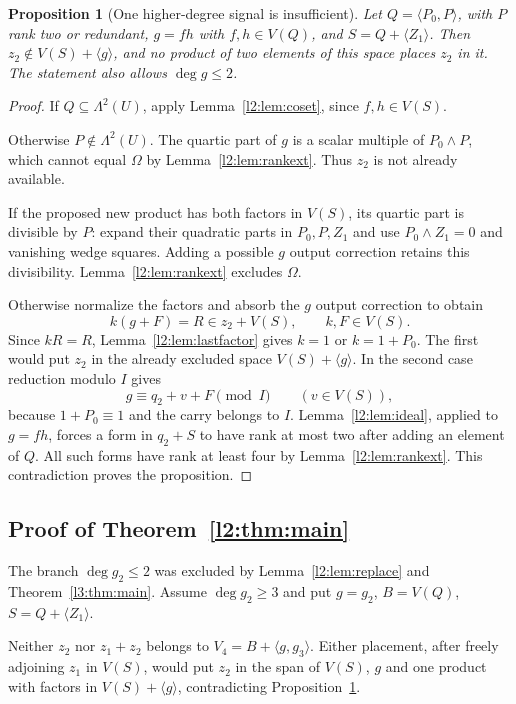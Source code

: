 \documentclass[11pt,a4paper]{article}
\theoremstyle{plain}
\newtheorem{proposition}[theorem]{Proposition}
\theoremstyle{remark}
\begin{document}
\begin{proposition}[One higher-degree signal is insufficient]\label{l2:prop:onehigh}
Let $Q=\langle P_0,P\rangle$, with $P$ rank two or redundant, $g=fh$ with $f,h\in V(Q)$, and $S=Q+\langle Z_1\rangle$. Then $z_2\notin V(S)+\langle g\rangle$, and no product of two elements of this space places $z_2$ in it. The statement also allows $\deg g\le2$.
\end{proposition}
\begin{proof}
If $Q\subseteq\Lambda^2(U)$, apply Lemma~\ref{l2:lem:coset}, since $f,h\in V(S)$.

Otherwise $P\notin\Lambda^2(U)$. The quartic part of $g$ is a scalar multiple of $P_0\wedge P$, which cannot equal $\Omega$ by Lemma~\ref{l2:lem:rankext}. Thus $z_2$ is not already available.

If the proposed new product has both factors in $V(S)$, its quartic part is divisible by $P$: expand their quadratic parts in $P_0,P,Z_1$ and use $P_0\wedge Z_1=0$ and vanishing wedge squares. Adding a possible $g$ output correction retains this divisibility. Lemma~\ref{l2:lem:rankext} excludes $\Omega$.

Otherwise normalize the factors and absorb the $g$ output correction to obtain
\[
k(g+F)=R\in z_2+V(S),\qquad k,F\in V(S).
\]
Since $kR=R$, Lemma~\ref{l2:lem:lastfactor} gives $k=1$ or $k=1+P_0$. The first would put $z_2$ in the already excluded space $V(S)+\langle g\rangle$. In the second case reduction modulo $I$ gives
\[
g\equiv q_2+v+F\pmod I\qquad(v\in V(S)),
\]
because $1+P_0\equiv1$ and the carry belongs to $I$. Lemma~\ref{l2:lem:ideal}, applied to $g=fh$, forces a form in $q_2+S$ to have rank at most two after adding an element of $Q$. All such forms have rank at least four by Lemma~\ref{l2:lem:rankext}. This contradiction proves the proposition.
\end{proof}

\subsection[Proof of the two-linear-gate theorem]{Proof of Theorem~\ref{l2:thm:main}}
The branch $\deg g_2\le2$ was excluded by Lemma~\ref{l2:lem:replace} and Theorem~\ref{l3:thm:main}. Assume $\deg g_2\ge3$ and put $g=g_2$, $B=V(Q)$, $S=Q+\langle Z_1\rangle$.

Neither $z_2$ nor $z_1+z_2$ belongs to $V_4=B+\langle g,g_3\rangle$. Either placement, after freely adjoining $z_1$ in $V(S)$, would put $z_2$ in the span of $V(S)$, $g$ and one product with factors in $V(S)+\langle g\rangle$, contradicting Proposition~\ref{l2:prop:onehigh}.
\end{document}
